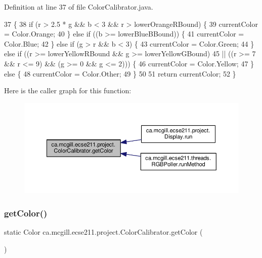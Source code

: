Definition at line 37 of file Color\+Calibrator.\+java.


\begin{DoxyCode}
37                                                     \{
38     \textcolor{keywordflow}{if} (r > 2.5 * g && b < 3 && r > lowerOrangeRBound) \{
39       currentColor = Color.Orange;
40     \} \textcolor{keywordflow}{else} \textcolor{keywordflow}{if} ((b >= lowerBlueBBound)) \{
41       currentColor = Color.Blue;
42     \} \textcolor{keywordflow}{else} \textcolor{keywordflow}{if} (g > r && b < 3) \{
43       currentColor = Color.Green;
44     \} \textcolor{keywordflow}{else} \textcolor{keywordflow}{if} ((r >= lowerYellowRBound && g >= lowerYellowGBound)
45         || ((r >= 7 && r <= 9) && (g >= 0 && g <= 2))) \{
46       currentColor = Color.Yellow;
47     \} \textcolor{keywordflow}{else} \{
48       currentColor = Color.Other;
49     \}
50 
51     \textcolor{keywordflow}{return} currentColor;
52   \}
\end{DoxyCode}
Here is the caller graph for this function\+:\nopagebreak
\begin{figure}[H]
\begin{center}
\leavevmode
\includegraphics[width=350pt]{classca_1_1mcgill_1_1ecse211_1_1project_1_1_color_calibrator_a92e653a6a9f7a31cb7b6f9bc2e732133_icgraph}
\end{center}
\end{figure}
\mbox{\label{classca_1_1mcgill_1_1ecse211_1_1project_1_1_color_calibrator_a1acf05f9523b2c0f329d4a7cbf1b9c47}} 
\subsubsection{\texorpdfstring{get\+Color()}{getColor()}\hspace{0.1cm}{\footnotesize\ttfamily [2/2]}}
{\footnotesize\ttfamily static Color ca.\+mcgill.\+ecse211.\+project.\+Color\+Calibrator.\+get\+Color (\begin{DoxyParamCaption}{ }\end{DoxyParamCaption})\hspace{0.3cm}{\ttfamily [static]}}

